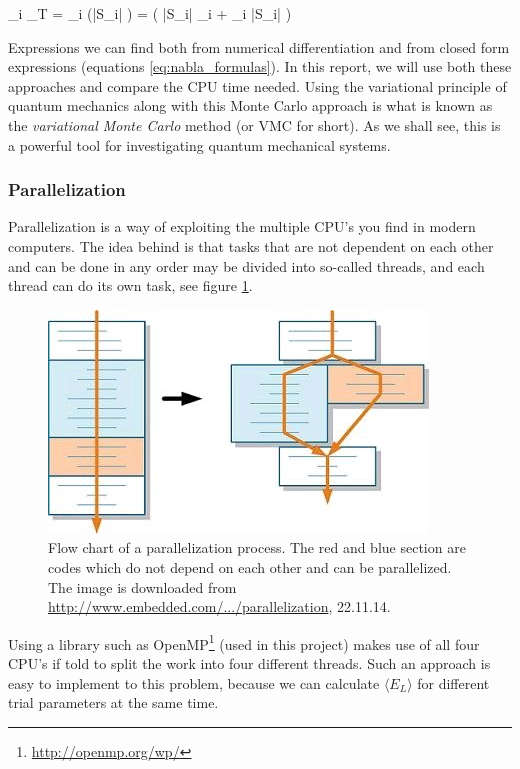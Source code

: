 \eqs
{} \nabla_i \Psi_T   =  \nabla_i (|S_i| \J)
= \left ( |S_i| \nabla_i \J + \J \nabla_i |S_i|  \right ) 
\eqf
\eqs
{}
\eqf

Expressions we can find both from numerical differentiation and from closed form expressions (equations \ref{eq:nabla_formulas}).
In this report, we will use both these approaches and compare the CPU time needed. 
Using the variational principle of quantum mechanics along with this Monte Carlo approach is what is known as the \textit{variational Monte Carlo} method (or VMC for short). 
As we shall see, this is a powerful tool for investigating quantum mechanical systems. 


\subsubsection{Parallelization}\label{sec:theory_parallelization}

Parallelization is a way of exploiting the multiple CPU's you find in modern computers. 
The idea behind is that tasks that are not dependent on each other and can be done in any order may be divided into so-called threads, and each thread can do its own task, see figure \ref{fig:parallelization}. 

\begin{figure}[h!]
	\centering 
	\includegraphics[scale=3]{theory/parallelization.jpg}
	\caption{Flow chart of a parallelization process. The red and blue section are codes which do not depend on each other and can be parallelized. The image is downloaded from \href{http://www.embedded.com/design/mcus-processors-and-socs/4204441/How-to-analyze-C-code-for-parallelization}{http://www.embedded.com/.../parallelization}, 22.11.14.}
	\label{fig:parallelization}
\end{figure}

Using a library such as OpenMP\footnote{\url{http://openmp.org/wp/}} (used in this project) makes use of all four CPU's if told to split the work into four different threads. 
Such an approach is easy to implement to this problem, because we can calculate $\langle E_L \rangle$ for different trial parameters at the same time. 
